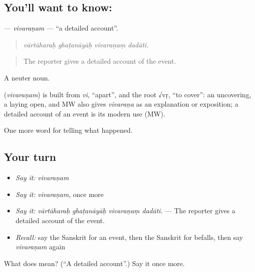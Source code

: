 \subsection*{You'll want to know: }
\textbf{} — \emph{vivaraṇam} — \textquotedblleft{}a detailed account\textquotedblright{}.

\begin{quote}
   
\end{quote}

\begin{quote}
\emph{vārtāharaḥ ghaṭanāyāḥ vivaraṇaṃ dadāti.}
\end{quote}

\begin{quote}
The reporter gives a detailed account of the event.
\end{quote}

A neuter noun.

\begin{cousinweb}
\textbf{} (\emph{vivaraṇam}) is built from \emph{vi}, \textquotedblleft{}apart\textquotedblright{}, and the root √vṛ, \textquotedblleft{}to cover\textquotedblright{}: an uncovering, a laying open, and MW also gives \emph{vivaraṇa} as an explanation or exposition; a detailed account of an event is its modern use (MW).
\end{cousinweb}

\begin{grammarlens}[title={What you've built}]
One more word for telling what happened.
\end{grammarlens}

\subsection*{Your turn}
\begin{itemize}
\raggedright
  \item \emph{Say it:} \emph{vivaraṇam}
  \item \emph{Say it:} \emph{vivaraṇam}, once more
  \item \emph{Say it:} \emph{vārtāharaḥ ghaṭanāyāḥ vivaraṇaṃ dadāti.} — The reporter gives a detailed account of the event.
  \item \emph{Recall:} say the Sanskrit for an event, then the Sanskrit for befalls, then say \emph{vivaraṇam} again
\end{itemize}

\begin{tcolorbox}[breakable,colback=teal!4,colframe=teal!35!black,title={Before you move on}]
What does  mean? (\textquotedblleft{}A detailed account\textquotedblright{}.) Say it once more.
\end{tcolorbox}
